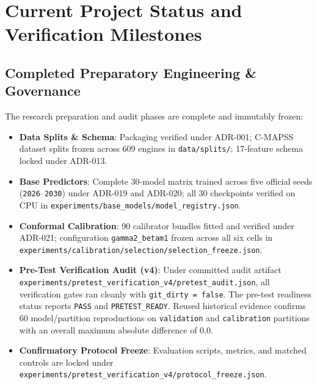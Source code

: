 \section{Current Project Status and Verification Milestones}

\subsection{Completed Preparatory Engineering \& Governance}
The research preparation and audit phases are complete and immutably frozen:
\begin{itemize}
  \item \textbf{Data Splits \& Schema}: Packaging verified under ADR-001; C-MAPSS dataset splits frozen across 609 engines in \texttt{data/splits/}; 17-feature schema locked under ADR-013.
  \item \textbf{Base Predictors}: Complete 30-model matrix trained across five official seeds (\texttt{2026}--\texttt{2030}) under ADR-019 and ADR-020; all 30 checkpoints verified on CPU in \texttt{experiments/base\_models/model\_registry.json}.
  \item \textbf{Conformal Calibration}: 90 calibrator bundles fitted and verified under ADR-021; configuration \texttt{gamma2\_betam1} frozen across all six cells in \texttt{experiments/calibration/selection/selection\_freeze.json}.
  \item \textbf{Pre-Test Verification Audit (v4)}: Under committed audit artifact \texttt{experiments/pretest\_verification\_v4/pretest\_audit.json}, all verification gates ran cleanly with \texttt{git\_dirty = false}. The pre-test readiness status reports \texttt{PASS} and \texttt{PRETEST\_READY}. Reused historical evidence confirms 60 model/partition reproductions on \texttt{validation} and \texttt{calibration} partitions with an overall maximum absolute difference of 0.0.
  \item \textbf{Confirmatory Protocol Freeze}: Evaluation scripts, metrics, and matched controls are locked under \texttt{experiments/pretest\_verification\_v4/protocol\_freeze.json}.
\end{itemize}

